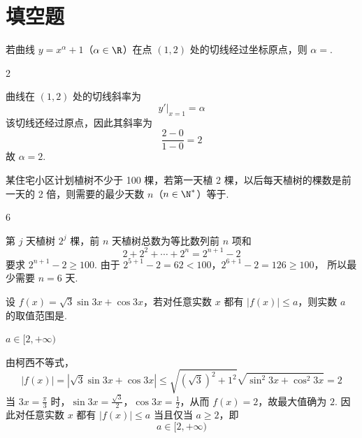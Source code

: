 \section{填空题}

\begin{problem}
若曲线 \(y = x^{\alpha} + 1\)（\(\alpha \in \R\)）在点 \((1,2)\) 处的切线经过坐标原点，则 \( \alpha = \)\fillinblank{}.
\end{problem}

\begin{answer}
2
\end{answer}

\begin{solution}
曲线在 \((1,2)\) 处的切线斜率为
\[
y'\big|_{x=1}=\alpha
\]
该切线还经过原点，因此其斜率为
\[
\frac{2-0}{1-0}=2
\]
故 \(\alpha=2\).
\end{solution}

\begin{problem}
某住宅小区计划植树不少于 100 棵，若第一天植 2 棵，以后每天植树的棵数是前一天的 2 倍，则需要的最少天数 \(n\)（\(n \in \N^{*}\)）等于\fillinblank{}.
\end{problem}

\begin{answer}
6
\end{answer}

\begin{solution}
第 \(j\) 天植树 \(2^{j}\) 棵，前 \(n\) 天植树总数为等比数列前 \(n\) 项和
\[
2+2^{2}+\cdots+2^{n}=2^{n+1}-2
\]
要求 \(2^{n+1}-2\geqslant100\). 由于
\(2^{5+1}-2=62<100\)，\(2^{6+1}-2=126\geqslant100\)，
所以最少需要 \(n=6\) 天.
\end{solution}

\begin{problem}
设 \( f(x) = \sqrt{3} \sin 3x + \cos 3x \)，若对任意实数 \( x \) 都有 \( |f(x)| \leqslant a \)，则实数 \( a \) 的取值范围是\fillinblank{}.
\end{problem}

\begin{answer}
\(a \in [2,+\infty)\)
\end{answer}

\begin{solution}
由柯西不等式，
\[
|f(x)|=|\sqrt3\sin3x+\cos3x|
 \leqslant\sqrt{(\sqrt3)^{2}+1^{2}}\sqrt{\sin^{2}3x+\cos^{2}3x}=2
\]
当 \(3x=\frac{\pi}{3}\) 时，\(\sin3x=\frac{\sqrt3}{2}\)，\(\cos3x=\frac12\)，从而 \(f(x)=2\)，故最大值确为 \(2\). 因此对任意实数 \(x\) 都有 \(|f(x)|\leqslant a\) 当且仅当 \(a\geqslant2\)，即
\[
a\in[2,+\infty)
\]
\end{solution}

